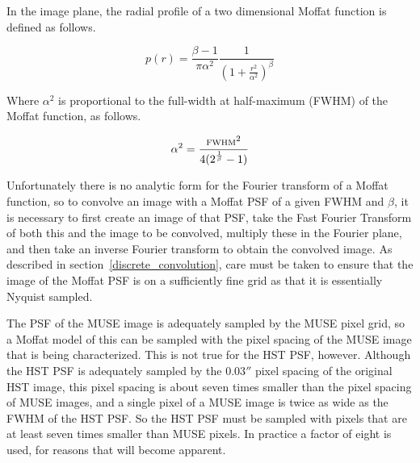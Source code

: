 \documentclass[12pt,twoside,a4paper]{article}
\newcommand{\arcsec}{''}
\begin{document}
In the image plane, the radial profile of a two dimensional Moffat
function is defined as follows.

\begin{equation}
p(r) = \frac{\beta-1}{\pi\alpha^2}\frac{1}{\left(1+\frac{r^2}{\alpha^2}\right)^{\beta}}
\end{equation}

Where $\alpha^2$ is proportional to the full-width at half-maximum
(FWHM) of the Moffat function, as follows.

\begin{equation}
\alpha^2 = \frac{\mbox{\scriptsize FWHM}^2}{4(2^{\frac{1}{\beta}} - 1)}
\end{equation}

Unfortunately there is no analytic form for the Fourier transform of a
Moffat function, so to convolve an image with a Moffat PSF of a given
FWHM and $\beta$, it is necessary to first create an image of that
PSF, take the Fast Fourier Transform of both this and the image to be
convolved, multiply these in the Fourier plane, and then take an
inverse Fourier transform to obtain the convolved image. As described
in section~\ref{discrete_convolution}, care must be taken to ensure
that the image of the Moffat PSF is on a sufficiently fine grid as
that it is essentially Nyquist sampled.

The PSF of the MUSE image is adequately sampled by the MUSE pixel
grid, so a Moffat model of this can be sampled with the pixel spacing
of the MUSE image that is being characterized. This is not true for
the HST PSF, however. Although the HST PSF is adequately sampled by
the $0.03\arcsec$ pixel spacing of the original HST image, this pixel
spacing is about seven times smaller than the pixel spacing of MUSE
images, and a single pixel of a MUSE image is twice as wide as the
FWHM of the HST PSF. So the HST PSF must be sampled with pixels that
are at least seven times smaller than MUSE pixels. In practice a
factor of eight is used, for reasons that will become apparent.
\end{document}
